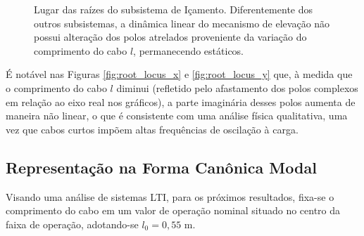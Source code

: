 \documentclass{ppgeesa}
\begin{document}
\begin{figure}[H]
    \centering
    \caption{Lugar das raízes do subsistema de Içamento. Diferentemente dos outros subsistemas, a dinâmica linear do mecanismo de elevação não possui alteração dos polos atrelados proveniente da variação do comprimento do cabo $l$, permanecendo estáticos.}
    \label{fig:root_locus_l}
\end{figure}

É notável nas Figuras \ref{fig:root_locus_x} e \ref{fig:root_locus_y} que, à medida que o comprimento do cabo $l$ diminui (refletido pelo afastamento dos polos complexos em relação ao eixo real nos gráficos), a parte imaginária desses polos aumenta de maneira não linear, o que é consistente com uma análise física qualitativa, uma vez que cabos curtos impõem altas frequências de oscilação à carga.

\subsection{Representação na Forma Canônica Modal}

Visando uma análise de sistemas LTI, para os próximos resultados, fixa-se o comprimento do cabo em um valor de operação nominal situado no centro da faixa de operação, adotando-se $l_0 = 0{,}55$ \si{m}.
\end{document}
